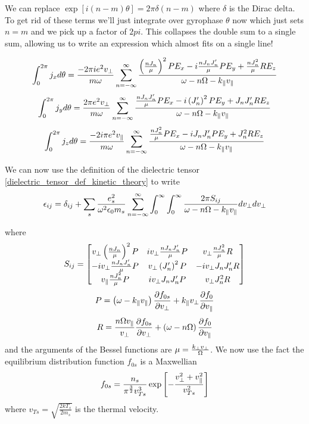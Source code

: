We can replace $\exp \left[i\left(n - m\right) \theta \right] = 2\pi\delta\left(n-m\right)$ where $\delta$ is the Dirac delta. To get rid of these terms we'll just integrate over gyrophase $\theta$ now which just sets $n=m$ and we pick up a factor of $2pi$. This collapses the double sum to a single sum, allowing us to write an expression which almost fits on a single line!

\begin{equation}
	\int_0^{2\pi} j_x d\theta = \frac{-2\pi ie^2v_\perp}{m \omega} \sum_{n=-\infty}^\infty \frac{\left(\frac{nJ_n}{\mu}\right)^2 P E_x - i \frac{nJ_n J_n'}{\mu} P E_y + \frac{nJ_n^2}{\mu} R E_z}{\omega-n\Omega-k_\parallel v_\parallel}
\end{equation}
\begin{equation}
	\int_0^{2\pi} j_y d\theta = \frac{2\pi e^2v_\perp}{m \omega} \sum_{n=-\infty}^\infty \frac{\frac{nJ_nJ_n'}{\mu} P E_x - i \left(J_n'\right)^2 P E_y + J_n J_n' R E_z}{\omega-n\Omega-k_\parallel v_\parallel}
\end{equation}
\begin{equation}
	\int_0^{2\pi} j_z d\theta = \frac{-2i\pi e^2v_\parallel}{m \omega} \sum_{n=-\infty}^\infty \frac{\frac{nJ_n^2}{\mu} P E_x - i J_n J_n' P E_y + J_n^2 R E_z}{\omega-n\Omega-k_\parallel v_\parallel}
\end{equation}

We can now use the definition of the dielectric tensor \eqref{dielectric_tensor_def_kinetic_theory} to write
\begin{equation}
	\epsilon_{ij} = \delta_{ij} + \sum_s \frac{e_s^2}{\omega^2 \epsilon_0 m_s} \sum_{n=-\infty}^\infty \int_0^\infty \int_0^\infty \frac{2\pi S_{ij}}{\omega-n\Omega-k_\parallel v_\parallel} dv_\perp dv_\perp
\end{equation}

where
\begin{equation}
	S_{ij} =
	\begin{bmatrix}
		v_\perp \left(\frac{nJ_n}{\mu}\right)^2 P & iv_\perp \frac{nJ_nJ_n'}{\mu} P & v_\perp \frac{nJ_n^2}{\mu} R\\
		- iv_\perp \frac{nJ_nJ_n'}{\mu} P & v_\perp \left(J_n'\right)^2 P & -i v_\perp J_n J_n' R\\
		v_\parallel \frac{nJ_n^2}{\mu} P & i v_\perp J_n J_n' P & v_\perp J_n^2 R\\
	\end{bmatrix}
\end{equation}
\begin{equation*}
	P = \left(\omega-k_\parallel v_\parallel\right)\frac{\partial f_{0s}}{\partial v_\perp} + k_\parallel v_\perp\frac{\partial f_0}{\partial v_\parallel}
\end{equation*}
\begin{equation*}
	R = \frac{n\Omega v_\parallel}{v_\perp} \frac{\partial f_{0s}}{\partial v_\perp} + \left(\omega - n\Omega\right) \frac{\partial f_0}{\partial v_\parallel}
\end{equation*}
and the arguments of the Bessel functions are $\mu = \frac{k_\perp v_\perp}{\Omega}$. We now use the fact the equilibrium distribution function $f_{0s}$ is a Maxwellian
\begin{equation}
	f_{0s} = \frac{n_s}{\pi^{\frac{3}{2}}v_{Ts}^3} \exp \left[ - \frac{v_\perp^2 + v_\parallel^2}{v_{Ts}^2} \right]
\end{equation}
where $v_{Ts} = \sqrt{\frac{2kT_s}{2m_s}}$ is the thermal velocity. 
